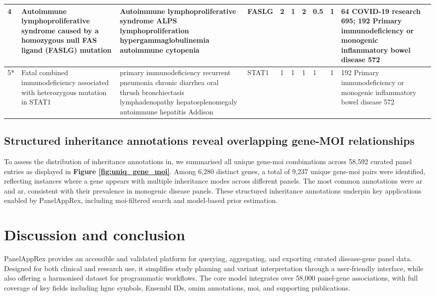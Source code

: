 \begin{table}[htbp]
{\begin{tabular}{|
    p{1cm}|
    p{4cm}|
    p{4cm}|
    p{1.4cm}|
    p{1.3cm}|
    p{1.3cm}|
    p{1.3cm}|
    p{1.3cm}|
    p{1.3cm}|
    p{5cm}|}
\hline																			
4	\cite{magerus-chatinet_autoimmune_2013}	 & 	Autoimmune lymphoproliferative syndrome caused by a homozygous null FAS ligand (FASLG) mutation	 & 	Autoimmune lymphoproliferative syndrome ALPS lymphoproliferation hypergammaglobulinemia autoimmune cytopenia	 & 	FASLG	 & 	2	 & 	1	 & 	2	 & 	0.5	 & 	1	 & 	64 COVID-19 research 695; 192 Primary immunodeficiency or monogenic inflammatory bowel disease 572 \\
\hline																			
5*	\cite{sharfe_fatal_2014}	 & 	Fatal combined immunodeficiency associated with heterozygous mutation in STAT1	 & 	primary immunodeficiency recurrent pneumonia chronic diarrhea oral thrush bronchiectasis lymphadenopathy hepatosplenomegaly autoimmune hepatitis Addison	 & 	STAT1	 & 	1	 & 	1	 & 	1	 & 	1	 & 	1	 & 	192 Primary immunodeficiency or monogenic inflammatory bowel disease 572 \\
\hline
\end{tabular}
}
\end{table}

\subsection{Structured inheritance annotations reveal overlapping gene-MOI relationships}

To assess the distribution of inheritance annotations in, we summarised all unique gene-\ac{moi} combinations across 58,592 curated panel entries as displayed in 
\textbf{Figure \ref{fig:uniq_gene_moi}}. Among 6,280 distinct genes, a total of 9,237 unique gene-\ac{moi} pairs were identified, reflecting instances where a gene appears with multiple inheritance modes across different panels. 
The most common annotations were \ac{ar} and \ac{ar}, consistent with their prevalence in monogenic disease panels. 
These structured inheritance annotations underpin key applications 
enabled by PanelAppRex, including \ac{moi}-filtered search and model-based prior estimation.


\FloatBarrier
\section{Discussion and conclusion}
\noindent
PanelAppRex provides an accessible and validated platform for querying, aggregating, and exporting curated disease-gene panel data. Designed for both clinical and research use, it simplifies study planning and variant interpretation through a user-friendly interface, while also offering a harmonised dataset for programmatic workflows. The core model integrates over 58,000 panel-gene associations, with full coverage of key fields including \ac{hgnc} symbols, Ensembl IDs, \ac{omim} annotations, \ac{moi}, and supporting publications.

